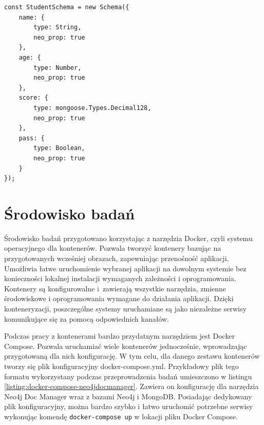 \documentclass[a4paper,twoside,12pt]{book}
\begin{document}
\begin{lstlisting}[style=JS, caption={Przykładowy schemat dla obiektów typu Student.}, label={listing:Schemat-student}, captionpos=b]
const StudentSchema = new Schema({
    name: {
        type: String,
        neo_prop: true
    },
    age: {
        type: Number,
        neo_prop: true
    },
    score: {
        type: mongoose.Types.Decimal128,
        neo_prop: true
    },
    pass: {
        type: Boolean,
        neo_prop: true
    }
});
\end{lstlisting}

\section{Środowisko badań} 

Środowisko badań przygotowano korzystając z narzędzia Docker, czyli systemu operacyjnego dla kontenerów. Pozwala tworzyć kontenery bazując na przygotowanych wcześniej obrazach, zapewniając przenośność aplikacji. Umożliwia łatwe uruchomienie wybranej aplikacji na dowolnym systemie bez konieczności lokalnej instalacji wymaganych zależności i oprogramowania. Kontenery są konfigurowalne i~zawierają wszystkie narzędzia, zmienne środowiskowe i oprogramowania wymagane do działania aplikacji. Dzięki konteneryzacji, poszczególne systemy uruchamiane są jako niezależne serwisy komunikujące się za pomocą odpowiednich kanałów. 

Podczas pracy z kontenerami bardzo przydatnym narzędziem jest Docker Compose. Pozwala uruchamiać wiele kontenerów jednocześnie, wprowadzając przygotowaną dla nich konfigurację. W tym celu, dla danego zestawu kontenerów tworzy się plik konfiguracyjny docker-compose.yml. Przykładowy plik tego formatu wykorzystany podczas przeprowadzenia badań umieszczono w listingu \ref{listing:docker-compose-neo4jdocmanager}. Zawiera on konfigurację dla narzędzia Neo4j Doc Manager wraz z bazami Neo4j i MongoDB. Posiadając dedykowany plik konfiguracyjny, można bardzo szybko i łatwo uruchomić potrzebne serwisy wykonując komendę \texttt{docker-compose up} w lokacji pliku Docker Compose.
\end{document}
